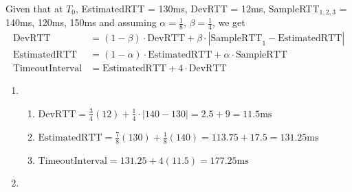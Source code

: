 \documentclass{report}
\begin{document}
\begin{problem}
\begin{answer}{50em}
    Given that at $T_0$, EstimatedRTT = 130ms, DevRTT = 12ms, SampleRTT$_{1, 2, 3}$ = 140ms, 120ms, 
    150ms and assuming $\alpha = \frac{1}{8}$, $\beta = \frac{1}{4}$, we get
    \begin{align*}
        \text{DevRTT} &= (1 - \beta) \cdot \text{DevRTT} + \beta \cdot | \text{SampleRTT}_1 - \text{EstimatedRTT}| \\
        \text{EstimatedRTT} &= (1 - \alpha) \cdot \text{EstimatedRTT} + \alpha \cdot \text{SampleRTT} \\
        \text{TimeoutInterval} &= \text{EstimatedRTT} + 4 \cdot \text{DevRTT}
    \end{align*}
    \begin{enumerate}[label=\arabic*.]
        \item
            \begin{enumerate}[label=\textit{(\roman*)}]
                \item
                    $
                    \text{DevRTT} = \frac{3}{4} (12) + \frac{1}{4} \cdot |140 - 130|
                    = 2.5 + 9
                    = 11.5 \text{ms}
                    $
                \item 
                    $
                    \text{EstimatedRTT} = \frac{7}{8} (130) + \frac{1}{8} (140)
                    = 113.75 + 17.5
                    = 131.25 \text{ms}
                    $
                \item 
                    $
                    \text{TimeoutInterval} = 131.25 + 4(11.5)
                    = 177.25 \text{ms}
                    $
            \end{enumerate}
        \item
\end{enumerate}
\end{answer}
\end{problem}
\end{document}
